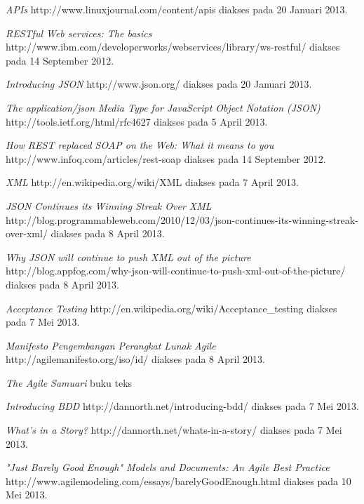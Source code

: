 \documentclass[a4paper, 12pt, oneside]{report}
\begin{document}
\begin{thebibliography}{99}
  \emph{APIs}
  http://www.linuxjournal.com/content/apis
  diakses pada 20 Januari 2013.

  \emph{RESTful Web services: The basics}
  \\http://www.ibm.com/developerworks/webservices/library/ws-restful/
  diakses pada 14 September 2012.

  \emph{Introducing JSON} http://www.json.org/
  diakses pada 20 Januari 2013.
  
  \emph{The application/json Media Type for JavaScript Object Notation (JSON)} http://tools.ietf.org/html/rfc4627
  diakses pada 5 April 2013.
    
  \emph{How REST replaced SOAP on the Web: What it means to you}
  http://www.infoq.com/articles/rest-soap
  diakses pada 14 September 2012.
  
  \emph{XML}
  http://en.wikipedia.org/wiki/XML
  diakses pada 7 April 2013.
  
  \emph{JSON Continues its Winning Streak Over XML}
  http://blog.programmableweb.com/2010/12/03/json-continues-its-winning-streak-over-xml/
  diakses pada 8 April 2013.
  
  \emph{Why JSON will continue to push XML out of the picture}
  http://blog.appfog.com/why-json-will-continue-to-push-xml-out-of-the-picture/
  diakses pada 8 April 2013.
  
  \emph{Acceptance Testing}
  http://en.wikipedia.org/wiki/Acceptance\_testing
  diakses pada 7 Mei 2013.

  \emph{Manifesto Pengembangan Perangkat Lunak Agile}
  http://agilemanifesto.org/iso/id/
  diakses pada 8 April 2013.
  
  \emph{The Agile Samuari}
  buku teks
  
  \emph{Introducing BDD}
  http://dannorth.net/introducing-bdd/
  diakses pada 7 Mei 2013.
  
  \emph{What's in a Story?}
  http://dannorth.net/whats-in-a-story/
  diakses pada 7 Mei 2013.

  \emph{"Just Barely Good Enough" Models and Documents: An Agile Best Practice}
  http://www.agilemodeling.com/essays/barelyGoodEnough.html
  diakses pada 10 Mei 2013.
 
\end{thebibliography}
\end{document}
